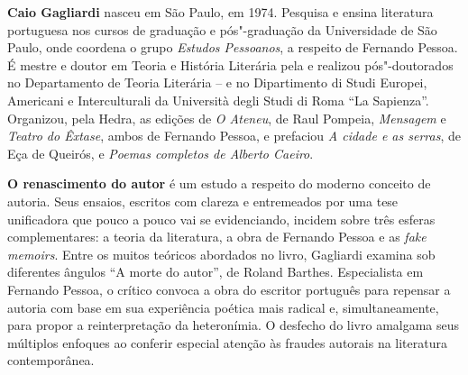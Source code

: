 
\textbf{Caio Gagliardi} nasceu em São Paulo, em 1974. Pesquisa e ensina literatura portuguesa nos cursos de graduação e pós"-graduação da Universidade de São Paulo, onde coordena o grupo \emph{Estudos Pessoanos}, a respeito de Fernando Pessoa. É mestre e doutor em Teoria e História Literária pela  e realizou pós"-doutorados no Departamento de Teoria Literária --  e no Dipartimento di Studi Europei, Americani e Interculturali da Università degli Studi di Roma ``La Sapienza''. Organizou, pela Hedra, as edições de \emph{O Ateneu}, de Raul Pompeia, \emph{Mensagem} e \emph{Teatro do Êxtase}, ambos de Fernando Pessoa, e prefaciou \emph{A cidade e as serras}, de Eça de Queirós, e \emph{Poemas completos de Alberto Caeiro}.


\textbf{O renascimento do autor} é um estudo a respeito do moderno conceito de autoria. Seus ensaios, escritos com clareza e entremeados por uma tese unificadora que pouco a pouco vai se evidenciando, incidem sobre três esferas complementares: a teoria da literatura, a obra de Fernando Pessoa e as \emph{fake memoirs}. Entre os muitos teóricos abordados no livro, Gagliardi examina sob diferentes ângulos ``A morte do autor'', de Roland Barthes. Especialista em Fernando Pessoa, o crítico convoca a obra do escritor português para repensar a autoria com base em sua experiência poética mais radical e, simultaneamente, para propor a reinterpretação da heteronímia. O desfecho do livro amalgama seus múltiplos enfoques ao conferir especial atenção às fraudes autorais na literatura contemporânea.

